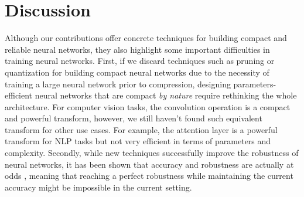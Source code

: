 \section{Discussion}
\label{section:ch6-perspectives_and_future_works}

Although our contributions offer concrete techniques for building compact and reliable neural networks, they also highlight some important difficulties in training neural networks. 
First, if we discard techniques such as pruning or quantization for building compact neural networks due to the necessity of training a large neural network prior to compression, designing parameters-efficient neural networks that are compact \emph{by nature} require rethinking the whole architecture.
For computer vision tasks, the convolution operation is a compact and powerful transform, however, we still haven't found such equivalent transform for other use cases.
For example, the attention layer is a powerful transform for NLP tasks but not very efficient in terms of parameters and complexity.
Secondly, while new techniques successfully improve the robustness of neural networks, it has been shown that accuracy and robustness are actually at odds \cite{zhang2019theoretically}, meaning that reaching a perfect robustness while maintaining the current accuracy might be impossible in the current setting.



